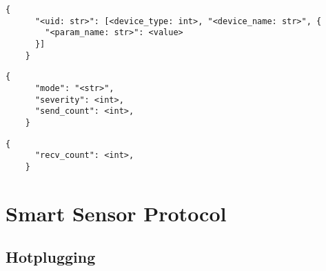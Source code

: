 \documentclass[12pt]{book}
\begin{document}
  \begin{lstlisting}[gobble=4, caption={\texttt{device-params} message (UDP from Runtime to Dawn)}]
    {
      "<uid: str>": [<device_type: int>, "<device_name: str>", {
        "<param_name: str>": <value>
      }]
    }
  \end{lstlisting}

  \begin{lstlisting}[gobble=4, caption={Heartbeat ping}]
    {
      "mode": "<str>",
      "severity": <int>,
      "send_count": <int>,
    }
  \end{lstlisting}

  \begin{lstlisting}[gobble=4, caption={Heartbeat response}]
    {
      "recv_count": <int>,
    }
  \end{lstlisting}

  \section{Smart Sensor Protocol}

  \subsection{Hotplugging}
\end{document}
